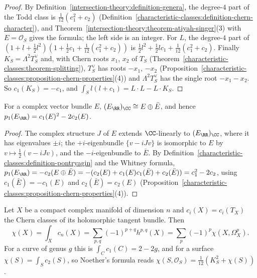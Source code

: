 \begin{proof}
By Definition~\ref{intersection-theory:definition-genera}, the degree-$4$ part of the Todd class is $\frac{1}{12}(c_1^2 + c_2)$ (Definition~\ref{characteristic-classes:definition-chern-character}), and Theorem~\ref{intersection-theory:theorem-atiyah-singer}(3) with
$E = \mathcal{O}_S$ gives the formula; the left side is an integer. For $L$, the degree-$4$ part of $(1 + l + \frac12l^2)(1 + \frac12c_1 + \frac{1}{12}(c_1^2 + c_2))$ is $\frac12l^2 + \frac12lc_1 + \frac{1}{12}(c_1^2 + c_2)$. Finally
$K_S = \Lambda^2T_S^\vee$ and, with Chern roots $x_1$, $x_2$ of $T_S$ (Theorem~\ref{characteristic-classes:theorem-splitting}), $T_S^\vee$ has roots $-x_1$, $-x_2$
(Proposition~\ref{characteristic-classes:proposition-chern-properties}(4)) and $\Lambda^2T_S^\vee$ has the single root $-x_1 - x_2$. So $c_1(K_S) = -c_1$, and $\int_Sl(l + c_1) = L \cdot L - L \cdot K_S$.
\end{proof}

\begin{lemma}\label{intersection-theory:lemma-pontryagin-complex}
For a complex vector bundle $E$, $(E_\RR)_\CC \cong E \oplus \bar E$, and hence $p_1(E_\RR) = c_1(E)^2 - 2c_2(E)$.
\end{lemma}

\begin{proof}
The complex structure $J$ of $E$ extends $\CC$-linearly to $(E_\RR)_\CC$, where it has eigenvalues $\pm i$; the $+i$-eigenbundle $\{v - iJv\}$ is isomorphic to $E$ by $v \mapsto \frac12(v - iJv)$, and the $-i$-eigenbundle to $\bar E$. By
Definition~\ref{characteristic-classes:definition-pontryagin} and the Whitney formula, $p_1(E_\RR) = -c_2(E \oplus \bar E) = -(c_2(E) + c_1(E)c_1(\bar E) + c_2(\bar E)) = c_1^2 - 2c_2$, using $c_1(\bar E) = -c_1(E)$ and $c_2(\bar E) = c_2(E)$
(Proposition~\ref{characteristic-classes:proposition-chern-properties}(4)).
\end{proof}

\begin{corollary}\label{intersection-theory:corollary-gauss-bonnet-complex}
Let $X$ be a compact complex manifold of dimension $n$ and $c_i(X) = c_i(T_X)$ the Chern classes of its holomorphic tangent bundle. Then
\[
\chi(X) = \int_Xc_n(X) = \sum_{p,q}(-1)^{p+q}h^{p,q}(X) = \sum_p(-1)^p\chi(X, \Omega^p_X).
\]
For a curve of genus $g$ this is $\int_Cc_1(C) = 2 - 2g$, and for a surface $\chi(S) = \int_Sc_2(S)$, so Noether's formula reads $\chi(S, \mathcal{O}_S) = \frac{1}{12}(K_S^2 + \chi(S))$.
\end{corollary}

